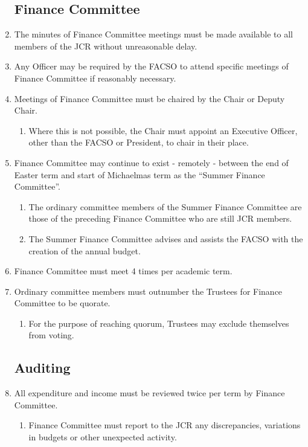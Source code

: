 \documentclass[12pt]{article}
\begin{document}
\begin{enumerate}
    \subsection{Finance Committee}
    \item The minutes of Finance Committee meetings must be made available to all members of the JCR without unreasonable delay.
    \item Any Officer may be required by the FACSO to attend specific meetings of Finance Committee if reasonably necessary.
       \item Meetings of Finance Committee must be chaired by the Chair or Deputy Chair.
    \begin{enumerate}
        \item Where this is not possible, the Chair must appoint an Executive Officer, other than the FACSO or President, to chair in their place.
    \end{enumerate}
    \item Finance Committee may continue to exist - remotely - between the end of Easter term and start of Michaelmas term as the ``Summer Finance Committee''.
    \begin{enumerate}
        \item The ordinary committee members of the Summer Finance Committee are those of the preceding Finance Committee who are still JCR members.
        \item The Summer Finance Committee advises and assists the FACSO with the creation of the annual budget.
    \end{enumerate}
    \item Finance Committee must meet 4 times per academic term.
    \item Ordinary committee members must outnumber the Trustees for Finance Committee to be quorate.
    \begin{enumerate}
        \item For the purpose of reaching quorum, Trustees may exclude themselves from voting.
    \end{enumerate} 

    \subsection{Auditing}
  \item All expenditure and income must be reviewed twice per term by Finance Committee. 
  \begin{enumerate}
      \item Finance Committee must report to the JCR any discrepancies, variations in budgets or other unexpected activity.
  \end{enumerate}
\end{enumerate}
\end{document}
